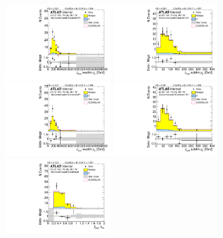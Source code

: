\begin{figure}[htb!]
\begin{center}
\includegraphics[width=0.41\textwidth,angle=-90]{figures/boosted/Control/b77_FourTag_Control_leadHCand_trk0_Pt.pdf}
\includegraphics[width=0.41\textwidth,angle=-90]{figures/boosted/Control/b77_FourTag_Control_leadHCand_trk1_Pt.pdf}\\
\includegraphics[width=0.41\textwidth,angle=-90]{figures/boosted/Control/b77_FourTag_Control_sublHCand_trk0_Pt.pdf}
\includegraphics[width=0.41\textwidth,angle=-90]{figures/boosted/Control/b77_FourTag_Control_sublHCand_trk1_Pt.pdf}\\
\includegraphics[width=0.41\textwidth,angle=-90]{figures/boosted/Control/b77_FourTag_Control_leadHCand_trk_dr.pdf}

\end{center}
\end{figure}
